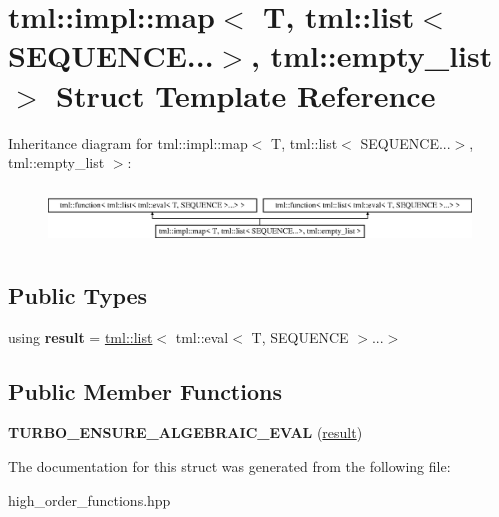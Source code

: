 \hypertarget{structtml_1_1impl_1_1map_3_01T_00_01tml_1_1list_3_01SEQUENCE_8_8_8_4_00_01tml_1_1empty__list_01_4}{\section{tml\+:\+:impl\+:\+:map$<$ T, tml\+:\+:list$<$ S\+E\+Q\+U\+E\+N\+C\+E...$>$, tml\+:\+:empty\+\_\+list $>$ Struct Template Reference}
\label{structtml_1_1impl_1_1map_3_01T_00_01tml_1_1list_3_01SEQUENCE_8_8_8_4_00_01tml_1_1empty__list_01_4}
}
Inheritance diagram for tml\+:\+:impl\+:\+:map$<$ T, tml\+:\+:list$<$ S\+E\+Q\+U\+E\+N\+C\+E...$>$, tml\+:\+:empty\+\_\+list $>$\+:\begin{figure}[H]
\begin{center}
\leavevmode
\includegraphics[height=1.590909cm]{structtml_1_1impl_1_1map_3_01T_00_01tml_1_1list_3_01SEQUENCE_8_8_8_4_00_01tml_1_1empty__list_01_4}
\end{center}
\end{figure}
\subsection*{Public Types}
\begin{DoxyCompactItemize}
\item 
\hypertarget{structtml_1_1impl_1_1map_3_01T_00_01tml_1_1list_3_01SEQUENCE_8_8_8_4_00_01tml_1_1empty__list_01_4_ac51367ef13b007294a796cb029e842c4}{using {\bfseries result} = \hyperlink{structtml_1_1list}{tml\+::list}$<$ tml\+::eval$<$ T, S\+E\+Q\+U\+E\+N\+C\+E $>$...$>$}\label{structtml_1_1impl_1_1map_3_01T_00_01tml_1_1list_3_01SEQUENCE_8_8_8_4_00_01tml_1_1empty__list_01_4_ac51367ef13b007294a796cb029e842c4}

\end{DoxyCompactItemize}
\subsection*{Public Member Functions}
\begin{DoxyCompactItemize}
\item 
\hypertarget{structtml_1_1impl_1_1map_3_01T_00_01tml_1_1list_3_01SEQUENCE_8_8_8_4_00_01tml_1_1empty__list_01_4_a02dabc90a1e455496535cd61c53ae76c}{{\bfseries T\+U\+R\+B\+O\+\_\+\+E\+N\+S\+U\+R\+E\+\_\+\+A\+L\+G\+E\+B\+R\+A\+I\+C\+\_\+\+E\+V\+A\+L} (\hyperlink{structtml_1_1list}{result})}\label{structtml_1_1impl_1_1map_3_01T_00_01tml_1_1list_3_01SEQUENCE_8_8_8_4_00_01tml_1_1empty__list_01_4_a02dabc90a1e455496535cd61c53ae76c}

\end{DoxyCompactItemize}


The documentation for this struct was generated from the following file\+:\begin{DoxyCompactItemize}
\item 
high\+\_\+order\+\_\+functions.\+hpp\end{DoxyCompactItemize}
